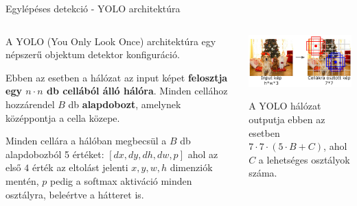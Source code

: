 \documentclass[english, aspectratio=169]{beamer}
\begin{document}
	\begin{frame}{Egylépéses detekció - YOLO architektúra}
		\begin{columns}
			\begin{column}{.5\textwidth}
				A YOLO (You Only Look Once) architektúra egy népszerű objektum detektor konfiguráció.\par\smallskip
				Ebben az esetben a hálózat az input képet \textbf{felosztja egy $n \cdot n$ db cellából álló hálóra}. Minden cellához hozzárendel $B$ db \textbf{alapdobozt}, amelynek középpontja a cella közepe.\par\smallskip
				Minden cellára a hálóban megbecsül a $B$ db alapdobozból 5 értéket: $[dx, dy, dh, dw, p]$ ahol az első $4$ érték az eltolást jelenti $x, y, w, h$ dimenziók mentén, $p$ pedig a softmax aktiváció minden osztályra, beleértve a hátteret is. 
			\end{column}
			\begin{column}{.5\textwidth}
				\begin{center}
					\includegraphics[width=7cm, keepaspectratio]{images/od_19.png}
				\end{center}
				A YOLO hálózat outputja ebben az esetben $7 \cdot 7 \cdot (5 \cdot B + C)$, ahol $C$ a lehetséges osztályok száma.
			\end{column}
		\end{columns}
	\end{frame}
	
\end{document}

